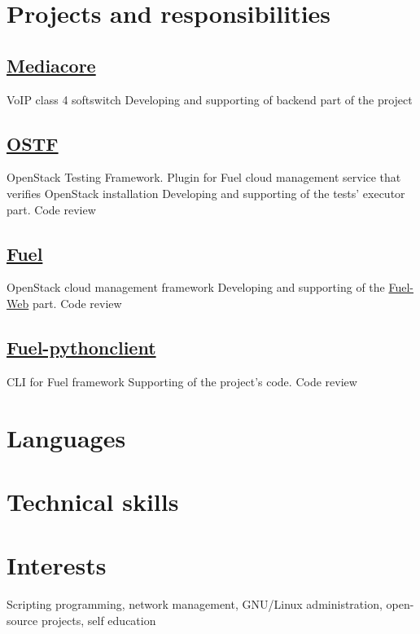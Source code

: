 \documentclass[10pt,a4paper,sans]{moderncv}
\begin{document}
\section{Projects and responsibilities}

\subsection{\href{http://speedflow.com/en/mediacore/overview}{Mediacore}}
        {VoIP class 4 softswitch}
        {Developing and supporting of backend part of the project}

\subsection{\href{https://github.com/stackforge/fuel-ostf}{OSTF}}
        {OpenStack Testing Framework. Plugin for Fuel cloud management service that verifies OpenStack installation}
        {Developing and supporting of the tests' executor part. Code review}

\subsection{\href{https://www.mirantis.com/products/mirantis-openstack-software/openstack-deployment-fuel/}{Fuel}}
        {OpenStack cloud management framework}
        {Developing and supporting of the \href{https://github.com/stackforge/fuel-web}{Fuel-Web} part. Code review}

\subsection{\href{https://github.com/stackforge/python-fuelclient}{Fuel-pythonclient}}
        {CLI for Fuel framework}
        {Supporting of the project's code. Code review}

\section{Languages}

\section{Technical skills}

\section{Interests}

Scripting programming, network management, GNU/Linux administration,
open-source projects, self education
\end{document}
